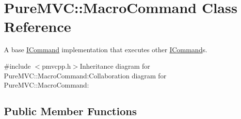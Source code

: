 \hypertarget{class_pure_m_v_c_1_1_macro_command}{
\section{PureMVC::MacroCommand Class Reference}
\label{class_pure_m_v_c_1_1_macro_command}
}


A base {\ttfamily \hyperlink{class_pure_m_v_c_1_1_i_command}{ICommand}} implementation that executes other {\ttfamily \hyperlink{class_pure_m_v_c_1_1_i_command}{ICommand}}s.  


{\ttfamily \#include $<$pmvcpp.h$>$}Inheritance diagram for PureMVC::MacroCommand:Collaboration diagram for PureMVC::MacroCommand:\subsection*{Public Member Functions}
